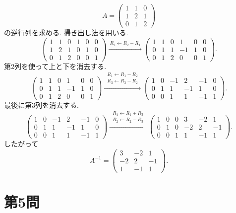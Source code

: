 \documentclass[uplatex,dvipdfmx,a4paper,14pt]{jsarticle}
\newcommand{\op}[1]{\xrightarrow{\ #1\ }}
\begin{document}
\[
A=\begin{pmatrix}1&1&0\\1&2&1\\0&1&2\end{pmatrix}
\]
の逆行列を求める. 掃き出し法を用いる.
\[
\left(
\begin{array}{ccc|ccc}
1&1&0&1&0&0\\
1&2&1&0&1&0\\
0&1&2&0&0&1
\end{array}
\right)
\op{R_2\leftarrow R_2-R_1}
\left(
\begin{array}{ccc|ccc}
1&1&0&1&0&0\\
0&1&1&-1&1&0\\
0&1&2&0&0&1
\end{array}
\right).
\]
第2列を使って上と下を消去する.
\[
\left(
\begin{array}{ccc|ccc}
1&1&0&1&0&0\\
0&1&1&-1&1&0\\
0&1&2&0&0&1
\end{array}
\right)
\op{\substack{R_1\leftarrow R_1-R_2\\ R_3\leftarrow R_3-R_2}}
\left(
\begin{array}{ccc|ccc}
1&0&-1&2&-1&0\\
0&1&1&-1&1&0\\
0&0&1&1&-1&1
\end{array}
\right).
\]
最後に第3列を消去する.
\[
\left(
\begin{array}{ccc|ccc}
1&0&-1&2&-1&0\\
0&1&1&-1&1&0\\
0&0&1&1&-1&1
\end{array}
\right)
\op{\substack{R_1\leftarrow R_1+R_3\\ R_2\leftarrow R_2-R_3}}
\left(
\begin{array}{ccc|ccc}
1&0&0&3&-2&1\\
0&1&0&-2&2&-1\\
0&0&1&1&-1&1
\end{array}
\right).
\]
したがって
\[
\boxed{
A^{-1}=
\begin{pmatrix}
3&-2&1\\
-2&2&-1\\
1&-1&1
\end{pmatrix}.}
\]

\section*{第5問}
\end{document}
